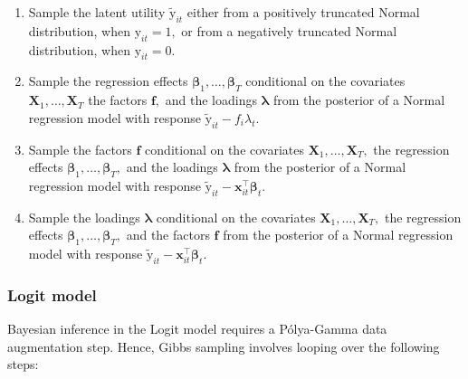 \documentclass[a4paper, preprint, 3p,
authoryear]{elsarticle} %
\begin{document}
\begin{enumerate}
   \item Sample the latent utility $\tilde{\text{y}}_{it}$ either from a positively truncated Normal distribution, when $\text{y}_{it} = 1,$ or from a negatively truncated Normal distribution, when $\text{y}_{it} = 0.$
    \item Sample the regression effects $\boldsymbol{\beta}_1,\dots,\boldsymbol{\beta}_T$ conditional on the covariates $\textbf{X}_1,\dots,\textbf{X}_T$ the factors $\mathbf{f},$ and the loadings $\boldsymbol{\lambda}$ from the posterior of a Normal regression model with response $\tilde{\text{y}}_{it}-f_i\lambda_t.$
    \item Sample the factors $\mathbf{f}$ conditional on the covariates $\textbf{X}_1,\dots,\textbf{X}_T,$ the regression effects $\boldsymbol{\beta}_1,\dots,\boldsymbol{\beta}_T,$ and the loadings $\boldsymbol{\lambda}$  from the posterior of a Normal regression model with response  $\tilde{\text{y}}_{it}-\textbf{x}_{it}^\top \boldsymbol{\beta}_t$.
    \item Sample the loadings $\boldsymbol{\lambda}$ conditional on the covariates $\textbf{X}_1,\dots,\textbf{X}_T,$ the regression effects $\boldsymbol{\beta}_1,\dots,\boldsymbol{\beta}_T,$ and the factors $\mathbf{f}$ from the posterior of a Normal regression model with response  $\tilde{\text{y}}_{it}-\textbf{x}_{it}^\top \boldsymbol{\beta}_t.$
\end{enumerate}

\subsubsection{Logit model}\label{logit-model}

Bayesian inference in the Logit model requires a Pólya-Gamma data
augmentation step. Hence, Gibbs sampling involves looping over the
following steps:
\end{document}
